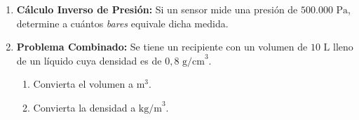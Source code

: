 \documentclass[../main]{subfiles}
\begin{document}
\begin{enumerate}
  \item \textbf{Cálculo Inverso de Presión:} Si un sensor mide una
    presión de $500.000 \text{ Pa}$, determine a cuántos
    \textit{bares} equivale dicha medida.

  \item \textbf{Problema Combinado:} Se tiene un recipiente con un
    volumen de $10 \text{ L}$ lleno de un líquido cuya densidad es de
    $0,8 \text{ g/cm}^3$.
    \begin{enumerate}
      \item Convierta el volumen a $\text{m}^3$.
      \item Convierta la densidad a $\text{kg/m}^3$.
    \end{enumerate}
\end{enumerate}
\end{document}
